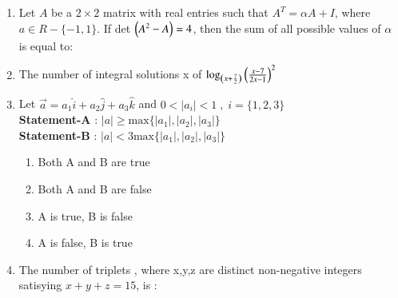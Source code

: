 \documentclass[journal,,12pt,onecolumn]{IEEEtran}
\theoremstyle{remark}
\begin{document}
\begin{enumerate}
 \bigskip
 \item Let $A$ be a $2 \times 2$ matrix with real entries such that $A^{T}=\alpha A + I$, where $a \in R -\{-1,1\}$. If det $\left(A^2-A\right)=4$, then the sum of all possible values of $\alpha$ is equal to: 
 \begin{enumerate}
 \end{enumerate}
\bigskip
 \item The number of integral solutions x of $\log_{\left(x+\frac{7}{2}\right)}{\left(\frac{x-7}{2x-1}\right)}^2$
 \begin{enumerate}
 \end{enumerate}
 \bigskip
 \item Let $\overset{\rightarrow}{a}=a_1\hat{i}+a_2\hat{j}+a_3\hat{k}$ and $0<|a_i|<1\;,\;i=\{1,2,3\}$\\
\textbf{Statement-A} : $|a|\ge \text{max}\{|a_1|,|a_2|,|a_3|\}$ \\
\textbf{Statement-B} : $|a|< \text{3max}\{|a_1|,|a_2|,|a_3|\}$
\begin{enumerate}
    \item Both A and B are true
    \item Both A and B are false
    \item A is true, B is false
    \item A is false, B is true
\end{enumerate}
\bigskip
 \item The number of triplets , where x,y,z are distinct non-negative integers satisying $x+y+z=15$, is :
 \begin{enumerate}
\end{enumerate}
\end{enumerate}
\end{document}
